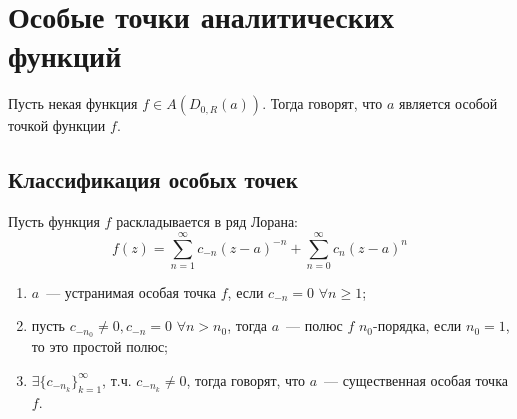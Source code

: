 \documentclass[main]{subfiles}
\begin{document}
\section{Особые точки аналитических функций}
\begin{definition}
    Пусть некая функция $f \in A(D_{0, R} (a))$.
    Тогда говорят, что $a$ является особой точкой функции $f$.
\end{definition}

\subsection{Классификация особых точек}
Пусть функция $f$ раскладывается в ряд Лорана:
\[f(z) = \sum_{n=1}^{\infty} c_{-n} (z-a)^{-n} + \sum_{n=0}^{\infty} c_{n} (z-a)^n \tag{1}\]
\begin{enumerate}
    \item $a$~--- устранимая особая точка $f$, если $c_{-n} = 0$ $\forall n \ge 1$;
    \item пусть $c_{-n_0} \neq 0, c_{-n} = 0$ $\forall n > n_0$, тогда $a$~--- полюс $f$ $n_0$-порядка, если $n_0 = 1$, то это простой полюс;
    \item $\exists \{c_{-n_k}\}_{k = 1}^\infty$, т.ч. $c_{-n_k} \neq 0$, тогда говорят, что $a$~--- существенная особая точка $f$.
\end{enumerate}
\end{document}
